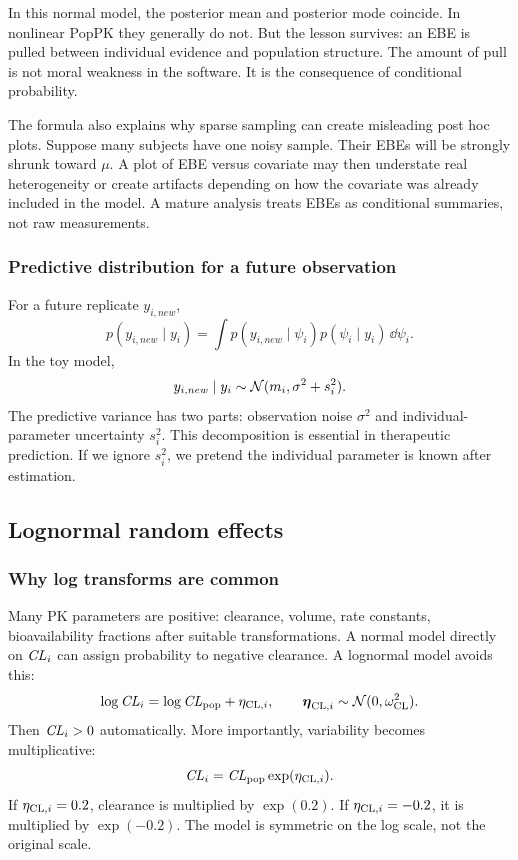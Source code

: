 In this normal model, the posterior mean and posterior mode coincide.  In nonlinear PopPK they generally do not.  But the lesson survives: an EBE is pulled between individual evidence and population structure.  The amount of pull is not moral weakness in the software.  It is the consequence of conditional probability.

The formula also explains why sparse sampling can create misleading post hoc plots.  Suppose many subjects have one noisy sample.  Their EBEs will be strongly shrunk toward \(\mu\).  A plot of EBE versus covariate may then understate real heterogeneity or create artifacts depending on how the covariate was already included in the model.  A mature analysis treats EBEs as conditional summaries, not raw measurements.

\subsubsection*{Predictive distribution for a future observation}

For a future replicate \(y_{i,new}\),
\[
  p(y_{i,new}\mid y_i)
  =
  \int p(y_{i,new}\mid \psi_i)p(\psi_i\mid y_i)\,\dd\psi_i.
\]
In the toy model,
\[
  y_{i,new}\mid y_i
  \sim
  \mathcal{N}(m_i,\sigma^2+s_i^2).
\]
The predictive variance has two parts: observation noise \(\sigma^2\) and individual-parameter uncertainty \(s_i^2\).  This decomposition is essential in therapeutic prediction.  If we ignore \(s_i^2\), we pretend the individual parameter is known after estimation.

\subsection{Lognormal random effects}

\subsubsection*{Why log transforms are common}

Many PK parameters are positive: clearance, volume, rate constants, bioavailability fractions after suitable transformations.  A normal model directly on \(\pksym{CL}_i\) can assign probability to negative clearance.  A lognormal model avoids this:
\[
  \log \pksym{CL}_i=\log \pksym{CL}_{\pop}+\eta_{\pklab{CL},i},
  \qquad
  \reta_{\pklab{CL},i}\sim\Normal(0,\omega_{\pklab{CL}}^2).
\]
Then \(\pksym{CL}_i>0\) automatically.  More importantly, variability becomes multiplicative:
\[
  \pksym{CL}_i=\pksym{CL}_{\pop}\exp(\eta_{\pklab{CL},i}).
\]
If \(\eta_{\mathrm{CL},i}=0.2\), clearance is multiplied by \(\exp(0.2)\).  If \(\eta_{\mathrm{CL},i}=-0.2\), it is multiplied by \(\exp(-0.2)\).  The model is symmetric on the log scale, not the original scale.

